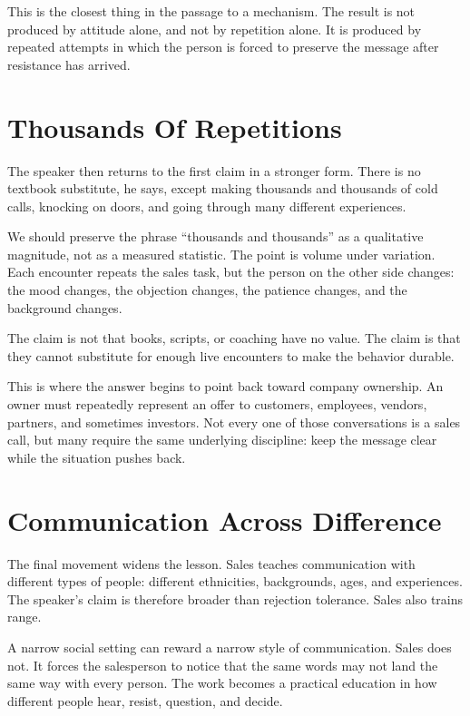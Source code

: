 This is the closest thing in the passage to a mechanism. The result is not produced by attitude alone, and not by repetition alone. It is produced by repeated attempts in which the person is forced to preserve the message after resistance has arrived.

\section{Thousands Of Repetitions}

The speaker then returns to the first claim in a stronger form. There is no textbook substitute, he says, except making thousands and thousands of cold calls, knocking on doors, and going through many different experiences.

We should preserve the phrase ``thousands and thousands'' as a qualitative magnitude, not as a measured statistic. The point is volume under variation. Each encounter repeats the sales task, but the person on the other side changes: the mood changes, the objection changes, the patience changes, and the background changes.

\begin{remark}
The claim is not that books, scripts, or coaching have no value. The claim is that they cannot substitute for enough live encounters to make the behavior durable.
\end{remark}

This is where the answer begins to point back toward company ownership. An owner must repeatedly represent an offer to customers, employees, vendors, partners, and sometimes investors. Not every one of those conversations is a sales call, but many require the same underlying discipline: keep the message clear while the situation pushes back.

\section{Communication Across Difference}

The final movement widens the lesson. Sales teaches communication with different types of people: different ethnicities, backgrounds, ages, and experiences. The speaker's claim is therefore broader than rejection tolerance. Sales also trains range.

A narrow social setting can reward a narrow style of communication. Sales does not. It forces the salesperson to notice that the same words may not land the same way with every person. The work becomes a practical education in how different people hear, resist, question, and decide.

